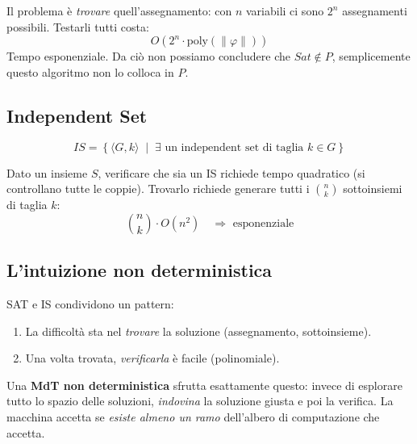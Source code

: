 Il problema è \textit{trovare} quell'assegnamento: con $n$ variabili ci sono $2^n$ assegnamenti possibili. Testarli tutti costa:
\[
  O\!\left(2^n \cdot \mathrm{poly}(\|\varphi\|)\right)
\]
Tempo esponenziale. Da ciò non possiamo concludere che $Sat \notin P$, semplicemente questo algoritmo non lo colloca in $P$.

\subsection{Independent Set}


\[
  IS = \left\{ \langle G, k \rangle \;\middle|\; \exists \text{ un independent set di taglia } k \in G \right\}
\]

Dato un insieme $S$, verificare che sia un IS richiede tempo quadratico (si controllano tutte le coppie). Trovarlo richiede generare tutti i $\binom{n}{k}$ sottoinsiemi di taglia $k$:
\[
  \binom{n}{k} \cdot O(n^2) \quad \Rightarrow \text{ esponenziale}
\]

\subsection{L'intuizione non deterministica}

SAT e IS condividono un pattern:
\begin{enumerate}
  \item La difficoltà sta nel \textit{trovare} la soluzione (assegnamento, sottoinsieme).
  \item Una volta trovata, \textit{verificarla} è facile (polinomiale).
\end{enumerate}

Una \textbf{MdT non deterministica} sfrutta esattamente questo: invece di esplorare tutto lo spazio delle soluzioni, \textit{indovina} la soluzione giusta e poi la verifica. La macchina accetta se \textit{esiste almeno un ramo} dell'albero di computazione che accetta.


